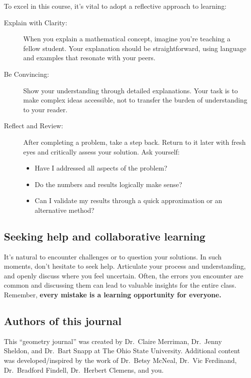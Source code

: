 \documentclass[handout,nooutcomes,noauthor,12pt]{ximera}
\begin{document}
To excel in this course, it's vital to adopt a reflective approach to
learning:
\begin{description}
  \item[Explain with Clarity:] When you explain a mathematical concept, imagine
    you're teaching a fellow student. Your explanation should be
    straightforward,
    using language and examples that resonate with your peers.
  \item[Be Convincing:] Show your understanding through detailed explanations.
    Your task is to make complex ideas accessible, not to transfer the burden
    of
    understanding to your reader.
  \item[Reflect and Review:] After completing a problem, take a step back.
    Return
    to it later with fresh eyes and critically assess your solution. Ask
    yourself:
    \begin{itemize}
      \item Have I addressed all aspects of the problem?
      \item Do the numbers and results logically make sense?
      \item Can I validate my results through a quick approximation
            or an alternative method?
    \end{itemize}
\end{description}

\subsection*{Seeking help and collaborative learning}

It's natural to encounter challenges or to question your solutions. In
such moments, don't hesitate to seek help. Articulate your process and
understanding, and openly discuss where you feel uncertain. Often, the
errors you encounter are common and discussing them can lead to
valuable insights for the entire class. Remember, \textbf{every
  mistake is a learning opportunity for everyone.}

\subsection*{Authors of this journal}

This ``geometry journal'' was created by Dr.\ Claire Merriman,
Dr.\ Jenny Sheldon, and Dr.\ Bart Snapp at The Ohio State
University. Additional content was developed/inspired by the work of
Dr.\ Betsy McNeal, Dr.\ Vic Ferdinand, Dr.\ Bradford Findell,
Dr.\ Herbert Clemens, and you.

\end{document}
